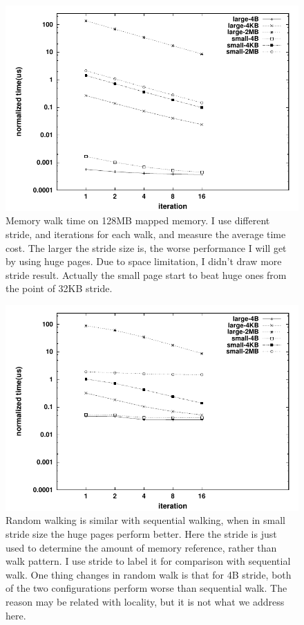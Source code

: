 \begin{figure}[hbt]
\centering
\includegraphics[width=0.9\linewidth]{../figures/hugetlb_128m}
\caption{Memory walk time on 128MB mapped memory. I use different stride, and
iterations for each walk, and measure the average time cost. The larger the 
stride size is, the worse performance I will get by using huge pages. Due to
space limitation, I didn't draw more stride result. Actually the small page
start to beat huge ones from the point of 32KB stride.}
\label{fig:hugetlb-time}
\end{figure}
\begin{figure}[h]
\includegraphics[width=0.9\linewidth]{../figures/hugetlb_rand_128m}
\caption{Random walking is similar with sequential walking, when in small stride
size the huge pages perform better. Here the stride is just used to determine
the amount of memory reference, rather than walk pattern. I use stride to label
it for comparison with sequential walk. One thing changes in random walk is
that for 4B stride, both of the two configurations perform worse than
sequential walk. The reason may be related with locality, but it is not what we
address here.}
\label{fig:hugetlb-rand}
\end{figure}

